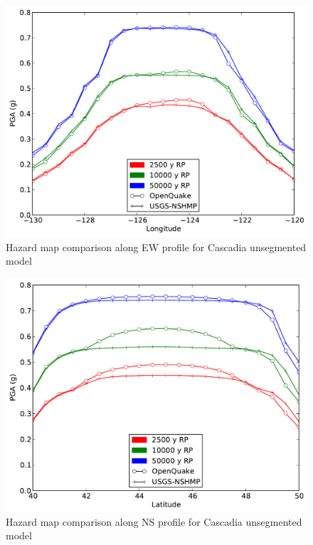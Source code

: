 \begin{figure}
\centering
\includegraphics[width=12.5cm]{./qareport/pictures/cascadia_float_oq_nshmp_ew.pdf}
\caption{Hazard map comparison along EW profile for Cascadia unsegmented model}
\label{fig:cascadia_float_ew}
\end{figure}
\begin{figure}
\centering
\includegraphics[width=12.5cm]{./qareport/pictures/cascadia_float_oq_nshmp_ns.pdf}
\caption{Hazard map comparison along NS profile for Cascadia unsegmented model}
\label{fig:cascadia_float_ns}
\end{figure}
